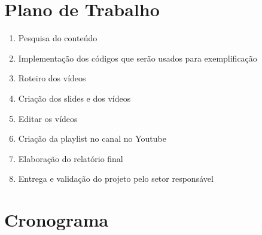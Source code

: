 \documentclass[a4paper,10pt]{article} %
\begin{document}

\section{Plano de Trabalho}

 \begin{enumerate}
  \item Pesquisa do conteúdo 
  \item Implementação dos códigos que serão usados para exemplificação
  \item Roteiro dos vídeos
  \item Criação dos slides e dos vídeos
  \item Editar os vídeos
  \item Criação da playlist no canal no Youtube
  \item Elaboração do relatório final
  \item Entrega e validação do projeto pelo setor responsável
\end{enumerate}

\section{Cronograma}
\end{document}

